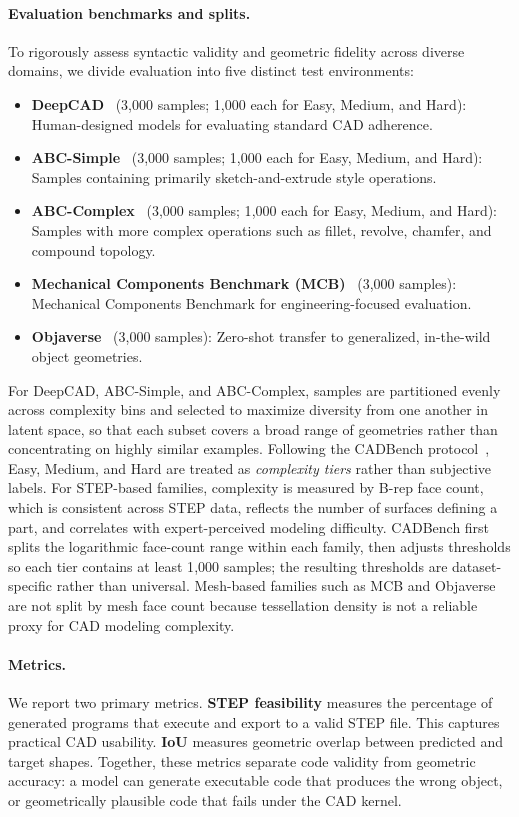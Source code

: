 \documentclass{article}
\begin{document}
\paragraph{Evaluation benchmarks and splits.}
To rigorously assess syntactic validity and geometric fidelity across diverse domains, we divide evaluation into five distinct test environments:
\begin{itemize}
    \item \textbf{DeepCAD}~\cite{wu2021deepcad} (3{,}000 samples; 1{,}000 each for Easy, Medium, and Hard): Human-designed models for evaluating standard CAD adherence.
    \item \textbf{ABC-Simple}~\cite{koch2019abc} (3{,}000 samples; 1{,}000 each for Easy, Medium, and Hard): Samples containing primarily sketch-and-extrude style operations.
    \item \textbf{ABC-Complex}~\cite{koch2019abc} (3{,}000 samples; 1{,}000 each for Easy, Medium, and Hard): Samples with more complex operations such as fillet, revolve, chamfer, and compound topology.
    \item \textbf{Mechanical Components Benchmark (MCB)}~\cite{sangpil2020large} (3{,}000 samples): Mechanical Components Benchmark for engineering-focused evaluation.
    \item \textbf{Objaverse}~\cite{deitke2023objaverse} (3{,}000 samples): Zero-shot transfer to generalized, in-the-wild object geometries.
\end{itemize}
For DeepCAD, ABC-Simple, and ABC-Complex, samples are partitioned evenly across complexity bins and selected to maximize diversity from one another in latent space, so that each subset covers a broad range of geometries rather than concentrating on highly similar examples. Following the CADBench protocol~\cite{cadbench}, Easy, Medium, and Hard are treated as \emph{complexity tiers} rather than subjective labels. For STEP-based families, complexity is measured by B-rep face count, which is consistent across STEP data, reflects the number of surfaces defining a part, and correlates with expert-perceived modeling difficulty. CADBench first splits the logarithmic face-count range within each family, then adjusts thresholds so each tier contains at least 1{,}000 samples; the resulting thresholds are dataset-specific rather than universal. Mesh-based families such as MCB and Objaverse are not split by mesh face count because tessellation density is not a reliable proxy for CAD modeling complexity.

\paragraph{Metrics.}
We report two primary metrics. \textbf{STEP feasibility} measures the percentage of generated programs that execute and export to a valid STEP file. This captures practical CAD usability. \textbf{IoU} measures geometric overlap between predicted and target shapes. Together, these metrics separate code validity from geometric accuracy: a model can generate executable code that produces the wrong object, or geometrically plausible code that fails under the CAD kernel.
\end{document}
